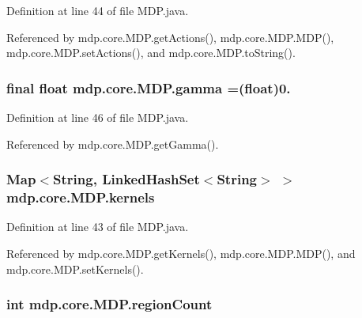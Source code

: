 Definition at line 44 of file M\+D\+P.\+java.



Referenced by mdp.\+core.\+M\+D\+P.\+get\+Actions(), mdp.\+core.\+M\+D\+P.\+M\+D\+P(), mdp.\+core.\+M\+D\+P.\+set\+Actions(), and mdp.\+core.\+M\+D\+P.\+to\+String().

\hypertarget{classmdp_1_1core_1_1_m_d_p_ab240c1d97d39d6f66cff0c8d06a57a69}{}
\subsubsection[{gamma}]{\setlength{\rightskip}{0pt plus 5cm}final float mdp.\+core.\+M\+D\+P.\+gamma =(float)0.\hspace{0.3cm}{\ttfamily [private]}}\label{classmdp_1_1core_1_1_m_d_p_ab240c1d97d39d6f66cff0c8d06a57a69}


Definition at line 46 of file M\+D\+P.\+java.



Referenced by mdp.\+core.\+M\+D\+P.\+get\+Gamma().

\hypertarget{classmdp_1_1core_1_1_m_d_p_ac185a95b0c9eb78b9d5a00b214696191}{}
\subsubsection[{kernels}]{\setlength{\rightskip}{0pt plus 5cm}Map$<$String, Linked\+Hash\+Set$<$String$>$ $>$ mdp.\+core.\+M\+D\+P.\+kernels\hspace{0.3cm}{\ttfamily [private]}}\label{classmdp_1_1core_1_1_m_d_p_ac185a95b0c9eb78b9d5a00b214696191}


Definition at line 43 of file M\+D\+P.\+java.



Referenced by mdp.\+core.\+M\+D\+P.\+get\+Kernels(), mdp.\+core.\+M\+D\+P.\+M\+D\+P(), and mdp.\+core.\+M\+D\+P.\+set\+Kernels().

\hypertarget{classmdp_1_1core_1_1_m_d_p_ae2644b9387e09a5c2ab096c0bb519f8d}{}
\subsubsection[{region\+Count}]{\setlength{\rightskip}{0pt plus 5cm}int mdp.\+core.\+M\+D\+P.\+region\+Count\hspace{0.3cm}{\ttfamily [private]}}\label{classmdp_1_1core_1_1_m_d_p_ae2644b9387e09a5c2ab096c0bb519f8d}


